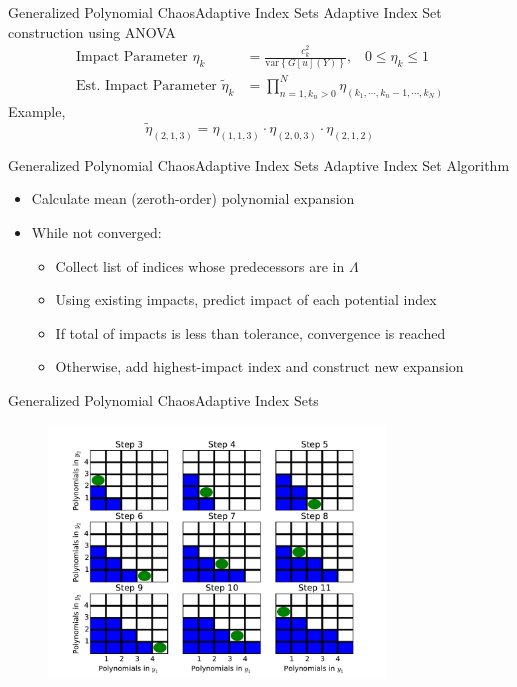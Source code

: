 \documentclass{beamer}
\begin{document}
\begin{frame}{Generalized Polynomial Chaos}{Adaptive Index Sets}%
  Adaptive Index Set construction using ANOVA
  \begin{align*}
    \text{Impact Parameter }\eta_k &=
    \frac{c_k^2}{\text{var}\left\{G[u](Y)\right\}},\hspace{10pt}0\leq\eta_k\leq 1\\
    \text{Est. Impact Parameter }\tilde\eta_k &= \prod_{n=1,k_n>0}^N \eta_{(k_1,\cdots,k_n-1,\cdots,k_N)}
  \end{align*}
  Example,
  \begin{equation*}
    \tilde\eta_{(2,1,3)}=\eta_{(1,1,3)}\cdot\eta_{(2,0,3)}\cdot\eta_{(2,1,2)}
  \end{equation*}
\end{frame}

\begin{frame}{Generalized Polynomial Chaos}{Adaptive Index Sets}%
  Adaptive Index Set Algorithm
  \begin{itemize}
    \item Calculate mean (zeroth-order) polynomial expansion
    \item While not converged:
      \begin{itemize}
        \item Collect list of indices whose predecessors are in $\Lambda$
        \item Using existing impacts, predict impact of each potential index
        \item If total of impacts is less than tolerance, convergence is reached
        \item Otherwise, add highest-impact index and construct new expansion
      \end{itemize}
  \end{itemize}
\end{frame}

\begin{frame}{Generalized Polynomial Chaos}{Adaptive Index Sets}%
 \begin{figure}[h!]
   \centering
   \includegraphics[width=0.8\textwidth]{../../graphics/asc_block}
 \end{figure}
\end{frame}
\end{document}
